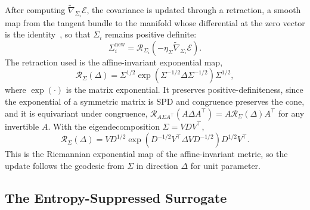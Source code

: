 After computing $\tilde{\nabla}_{\Sigma_i}\mathcal{E}$, the covariance is updated through a retraction, a smooth map from the tangent bundle to the manifold whose differential at the zero vector is the identity~\cite{Absil2008}, so that $\Sigma_i$ remains positive definite:
\begin{equation}
\Sigma_i^{\mathrm{new}} = \mathcal{R}_{\Sigma_i}(-\eta_\Sigma \tilde{\nabla}_{\Sigma_i}\mathcal{E}).
\end{equation}
The retraction used is the affine-invariant exponential map,
\begin{equation}
\mathcal{R}_{\Sigma}(\Delta) = \Sigma^{1/2} \exp\left(\Sigma^{-1/2} \Delta \Sigma^{-1/2}\right) \Sigma^{1/2},
\end{equation}
where $\exp(\cdot)$ is the matrix exponential. It preserves positive-definiteness, since the exponential of a symmetric matrix is SPD and congruence preserves the cone, and it is equivariant under congruence, $\mathcal{R}_{A\Sigma A^\top}(A\Delta A^\top) = A \mathcal{R}_{\Sigma}(\Delta) A^\top$ for any invertible $A$. With the eigendecomposition $\Sigma = V D V^\top$,
\begin{equation}
\mathcal{R}_{\Sigma}(\Delta) = V D^{1/2} \exp\left(D^{-1/2} V^\top \Delta V D^{-1/2}\right) D^{1/2} V^\top.
\end{equation}
This is the Riemannian exponential map of the affine-invariant metric, so the update follows the geodesic from $\Sigma$ in direction $\Delta$ for unit parameter.

\subsection*{The Entropy-Suppressed Surrogate}

